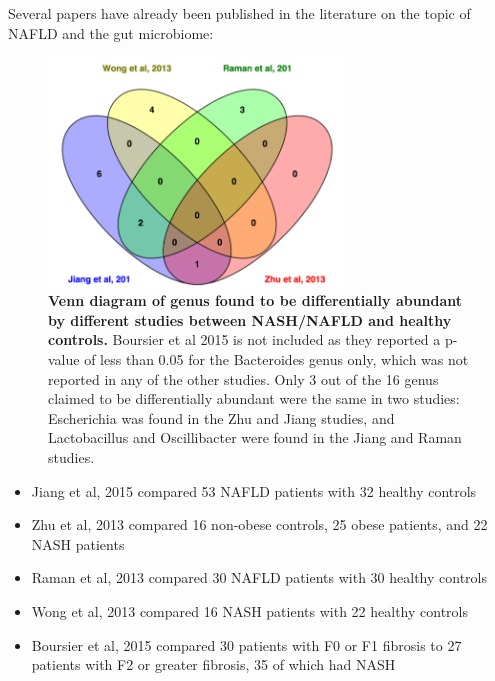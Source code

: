 Several papers have already been published in the literature on the topic of NAFLD and the gut microbiome:

\begin{figure}[h]
\begin{center}
\includegraphics[width=0.7\textwidth]{nafld_papers.png}
\caption{\textbf{Venn diagram of genus found to be differentially abundant by different studies between NASH/NAFLD and healthy controls.} Boursier et al 2015 is not included as they reported a p-value of less than 0.05 for the Bacteroides genus only, which was not reported in any of the other studies. Only 3 out of the 16 genus claimed to be differentially abundant were the same in two studies: Escherichia was found in the Zhu \cite{zhu2013characterization} and Jiang \cite{jiang2015dysbiosis} studies, and Lactobacillus and Oscillibacter were found in the Jiang \cite{jiang2015dysbiosis} and Raman \cite{raman2013fecal} studies.}
\end{center}
\end{figure}

\begin{itemize}
\item Jiang et al, 2015 \cite{jiang2015dysbiosis} compared 53 NAFLD patients with 32 healthy controls

\item Zhu et al, 2013 \cite{zhu2013characterization} compared 16 non-obese controls, 25 obese patients, and 22 NASH patients

\item Raman et al, 2013 \cite{raman2013fecal} compared 30 NAFLD patients with 30 healthy controls

\item Wong et al, 2013 \cite{wong2013molecular} compared 16 NASH patients with 22 healthy controls

\item Boursier et al, 2015 \cite{boursier2016severity} compared 30 patients with F0 or F1 fibrosis to 27 patients with F2 or greater fibrosis, 35 of which had NASH
\end{itemize}

